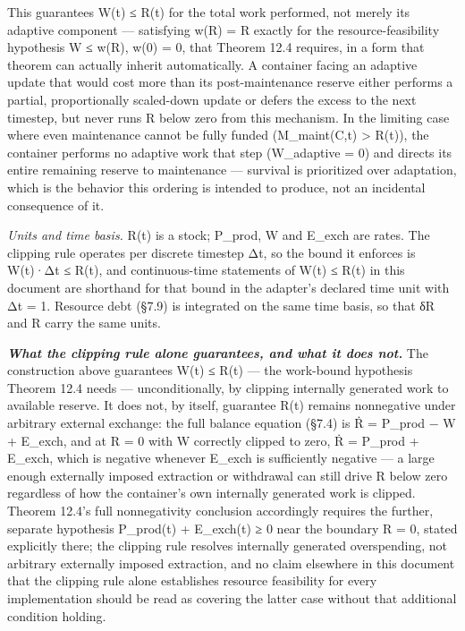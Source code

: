 \documentclass[
]{article}
\begin{document}
This guarantees W(t) ≤ R(t) for the total work performed, not merely its
adaptive component --- satisfying w(R) = R exactly for the
resource-feasibility hypothesis W ≤ w(R), w(0) = 0, that Theorem 12.4
requires, in a form that theorem can actually inherit automatically. A
container facing an adaptive update that would cost more than its
post-maintenance reserve either performs a partial, proportionally
scaled-down update or defers the excess to the next timestep, but never
runs R below zero from this mechanism. In the limiting case where even
maintenance cannot be fully funded (M\_maint(C,t) \textgreater{} R(t)),
the container performs no adaptive work that step (W\_adaptive = 0) and
directs its entire remaining reserve to maintenance --- survival is
prioritized over adaptation, which is the behavior this ordering is
intended to produce, not an incidental consequence of it.

\emph{Units and time basis.} R(t) is a stock; P\_prod, W and E\_exch are
rates. The clipping rule operates per discrete timestep Δt, so the bound
it enforces is W(t)·Δt ≤ R(t), and continuous-time statements of W(t) ≤
R(t) in this document are shorthand for that bound in the adapter's
declared time unit with Δt = 1. Resource debt (§7.9) is integrated on
the same time basis, so that δR and R carry the same units.

\emph{\textbf{What the clipping rule alone guarantees, and what it does
not.}} The construction above guarantees W(t) ≤ R(t) --- the work-bound
hypothesis Theorem 12.4 needs --- unconditionally, by clipping
internally generated work to available reserve. It does not, by itself,
guarantee R(t) remains nonnegative under arbitrary external exchange:
the full balance equation (§7.4) is Ṙ = P\_prod − W + E\_exch, and at R
= 0 with W correctly clipped to zero, Ṙ = P\_prod + E\_exch, which is
negative whenever E\_exch is sufficiently negative --- a large enough
externally imposed extraction or withdrawal can still drive R below zero
regardless of how the container's own internally generated work is
clipped. Theorem 12.4's full nonnegativity conclusion accordingly
requires the further, separate hypothesis P\_prod(t) + E\_exch(t) ≥ 0
near the boundary R = 0, stated explicitly there; the clipping rule
resolves internally generated overspending, not arbitrary externally
imposed extraction, and no claim elsewhere in this document that the
clipping rule alone establishes resource feasibility for every
implementation should be read as covering the latter case without that
additional condition holding.
\end{document}
